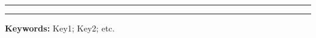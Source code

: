 \begin{comment}
\selectlanguage{french}
\begin{Abstract}
 \rule{\linewidth}{.7pt}
 aaaa.
 \rule{\linewidth}{.7pt}
 {\bf Mots cl\'es :} 111 ; 222 ; 333 ; *** ; *** ; ***.
\end{Abstract}
\end{comment}

\begin{Abstract}
 \rule{\linewidth}{.7pt}
  \MyPara
 \noindent\rule{\linewidth}{.7pt}
 {\bf Keywords:} Key1; Key2; etc.
\end{Abstract}
